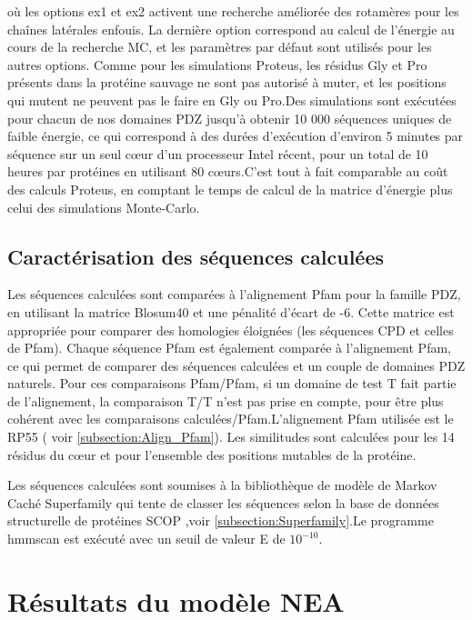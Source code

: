 où les options ex1 et ex2 activent une recherche améliorée des rotamères pour les chaînes latérales enfouis. La dernière option correspond au calcul de l'énergie au cours de la recherche MC, et les paramètres par défaut sont utilisés pour les autres options.
Comme pour les simulations Proteus, les résidus Gly et Pro présents dans la protéine sauvage ne sont pas autorisé à muter, et les positions qui mutent ne peuvent pas le faire en Gly  ou Pro.Des simulations sont exécutées pour chacun de nos domaines PDZ jusqu'à obtenir 10 000 séquences uniques de faible énergie, ce qui correspond à des durées d'exécution d'environ 5 minutes par séquence sur un seul cœur d'un processeur Intel récent, pour un total de 10 heures par protéines en utilisant 80 cœurs.C'est tout à fait comparable au coût des calculs Proteus, en comptant le temps de calcul de la matrice d'énergie plus celui des simulations Monte-Carlo.


\subsection{Caractérisation des séquences calculées}

Les séquences calculées sont comparées à l'alignement Pfam pour la famille PDZ, en utilisant la matrice Blosum40 et une pénalité d'écart de -6. Cette matrice est appropriée pour comparer des homologies éloignées (les séquences CPD et celles de Pfam). Chaque séquence Pfam est également comparée à l'alignement Pfam, ce qui permet de comparer des séquences calculées et un couple de domaines PDZ naturels. Pour ces comparaisons Pfam/Pfam, si un domaine de test T fait partie de l'alignement, la comparaison T/T n'est pas prise en compte, pour être plus cohérent avec les comparaisons calculées/Pfam.L'alignement Pfam utilisée est le \og RP55 \fg ( voir \ref{subsection:Align_Pfam}). Les similitudes sont calculées pour les 14 résidus du cœur et pour l'ensemble des positions mutables de la protéine.

Les séquences calculées sont soumises à la bibliothèque de modèle de Markov Caché Superfamily \cite{Gough01,Wilson07}  qui tente de classer les séquences selon la base de données structurelle de protéines SCOP \cite{Andreeva04},voir \ref{subsection:Superfamily}.Le programme hmmscan est exécuté avec un seuil de valeur E de $10^{-10}$. 

\section {Résultats du modèle NEA}
\label{sectionNEA} 
